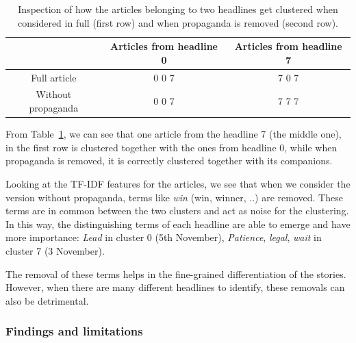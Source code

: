 \begin{table}[!htbp]
    \centering
    \begin{tabular}{c|c|c}
         & Articles from headline 0 & Articles from headline 7 \\
         \hline
        Full article & 0 0 7 & 7 0 7 \\
        Without propaganda & 0 0 7 & 7 7 7
    \end{tabular}
    \caption{Inspection of how the articles belonging to two headlines get clustered when considered in full (first row) and when propaganda is removed (second row).}
    \label{tab:sentpropnoise_inspection}
\end{table}



From Table~\ref{tab:sentpropnoise_inspection}, we can see that one article from the headline 7 (the middle one), in the first row is clustered together with the ones from headline 0, while when propaganda is removed, it is correctly clustered together with its companions.

Looking at the TF-IDF features for the articles, we see that when we consider the version without propaganda, terms like \emph{win} (win, winner, ..) are removed. These terms are in common between the two clusters and act as noise for the clustering.
In this way, the distinguishing terms of each headline are able to emerge and have more importance:
\emph{Lead} in cluster 0 (5th November), 
\emph{Patience}, \emph{legal}, \emph{wait} in cluster 7 (3 November).

The removal of these terms helps in the fine-grained differentiation of the stories.
However, when there are many different headlines to identify, these removals can also be detrimental.


\subsubsection{Findings and limitations} %
\label{ssec:lp_relationship_removing_findings}

